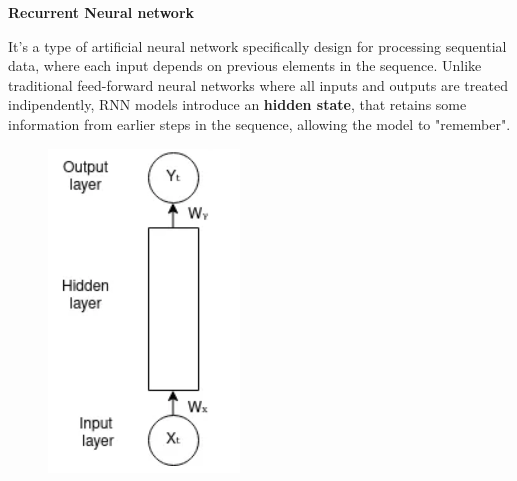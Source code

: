 \textbf{Recurrent Neural network}

It's a type of artificial neural network specifically design for processing sequential data, where each input depends on previous elements in the sequence. Unlike traditional feed-forward neural networks where all  inputs and outputs are treated indipendently, RNN models introduce an \textbf{hidden state}, that retains some information from earlier steps in the sequence, allowing the model to "remember".
\begin{figure}[H]
    \begin{minipage}{0.3168\textwidth}
        \centering
        \includegraphics[width=\textwidth]{Machine_learning_thesis/Images/FeedForward Neural Network.png}

\end{minipage}
\end{figure}
